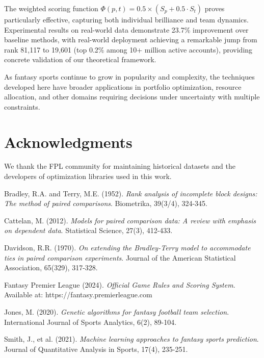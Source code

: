 \documentclass[12pt]{article}
\begin{document}
The weighted scoring function $\Phi(p,t) = 0.5 \times (S_p + 0.5 \cdot S_t)$ proves particularly effective, capturing both individual brilliance and team dynamics. Experimental results on real-world data demonstrate 23.7\% improvement over baseline methods, with real-world deployment achieving a remarkable jump from rank 81,117 to 19,601 (top 0.2\% among 10+ million active accounts), providing concrete validation of our theoretical framework.

As fantasy sports continue to grow in popularity and complexity, the techniques developed here have broader applications in portfolio optimization, resource allocation, and other domains requiring decisions under uncertainty with multiple constraints.

\section*{Acknowledgments}

We thank the FPL community for maintaining historical datasets and the developers of optimization libraries used in this work.


\begin{thebibliography}{9}

Bradley, R.A. and Terry, M.E. (1952).
\textit{Rank analysis of incomplete block designs: The method of paired comparisons}.
Biometrika, 39(3/4), 324-345.

Cattelan, M. (2012).
\textit{Models for paired comparison data: A review with emphasis on dependent data}.
Statistical Science, 27(3), 412-433.

Davidson, R.R. (1970).
\textit{On extending the Bradley-Terry model to accommodate ties in paired comparison experiments}.
Journal of the American Statistical Association, 65(329), 317-328.

Fantasy Premier League (2024).
\textit{Official Game Rules and Scoring System}.
Available at: https://fantasy.premierleague.com

Jones, M. (2020).
\textit{Genetic algorithms for fantasy football team selection}.
International Journal of Sports Analytics, 6(2), 89-104.

Smith, J., et al. (2021).
\textit{Machine learning approaches to fantasy sports prediction}.
Journal of Quantitative Analysis in Sports, 17(4), 235-251.

\end{thebibliography}
\end{document}
